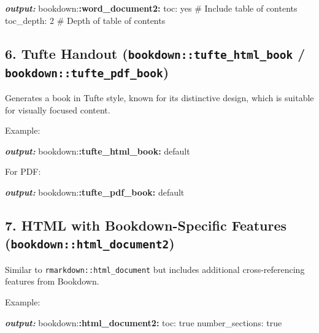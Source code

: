 \documentclass[
]{book}
\newenvironment{Shaded}{\begin{snugshade}}{\end{snugshade}}
\newcommand{\AnnotationTok}[1]{\textcolor[rgb]{0.56,0.35,0.01}{\textbf{\textit{#1}}}}
\newcommand{\NormalTok}[1]{#1}
\newcommand{\SpecialCharTok}[1]{\textcolor[rgb]{0.81,0.36,0.00}{\textbf{#1}}}
\theoremstyle{definition}
\theoremstyle{definition}
\theoremstyle{definition}
\theoremstyle{definition}
\theoremstyle{remark}
\begin{document}
\begin{Shaded}
\begin{Highlighting}[]
\AnnotationTok{output:}
\NormalTok{  bookdown:}\SpecialCharTok{:word\_document2:}
\NormalTok{    toc: yes  \# Include table of contents}
\NormalTok{    toc\_depth: 2  \# Depth of table of contents}
\end{Highlighting}
\end{Shaded}

\subsection{\texorpdfstring{6. Tufte Handout (\texttt{bookdown::tufte\_html\_book} / \texttt{bookdown::tufte\_pdf\_book})}{6. Tufte Handout (bookdown::tufte\_html\_book / bookdown::tufte\_pdf\_book)}}\label{tufte-handout-bookdowntufte_html_book-bookdowntufte_pdf_book}

Generates a book in Tufte style, known for its distinctive design, which is suitable for visually focused content.

Example:

\begin{Shaded}
\begin{Highlighting}[]
\AnnotationTok{output:}
\NormalTok{  bookdown:}\SpecialCharTok{:tufte\_html\_book:}\NormalTok{ default}
\end{Highlighting}
\end{Shaded}

For PDF:

\begin{Shaded}
\begin{Highlighting}[]
\AnnotationTok{output:}
\NormalTok{  bookdown:}\SpecialCharTok{:tufte\_pdf\_book:}\NormalTok{ default}
\end{Highlighting}
\end{Shaded}

\subsection{\texorpdfstring{7. HTML with Bookdown-Specific Features (\texttt{bookdown::html\_document2})}{7. HTML with Bookdown-Specific Features (bookdown::html\_document2)}}\label{html-with-bookdown-specific-features-bookdownhtml_document2}

Similar to \texttt{rmarkdown::html\_document} but includes additional cross-referencing features from Bookdown.

Example:

\begin{Shaded}
\begin{Highlighting}[]
\AnnotationTok{output:}
\NormalTok{  bookdown:}\SpecialCharTok{:html\_document2:}
\NormalTok{    toc: true}
\NormalTok{    number\_sections: true}
\end{Highlighting}
\end{Shaded}
\end{document}
